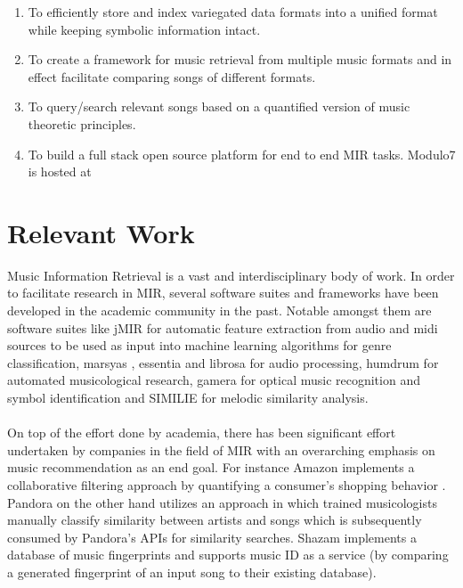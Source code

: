 \documentclass{article}
\begin{document}
\begin{enumerate}
\item To efficiently store and index variegated data formats into a unified format while keeping symbolic information intact.
\item To create a framework for music retrieval from multiple music formats and in effect facilitate comparing songs of different formats.
\item To query/search relevant songs based on a quantified version of music theoretic principles. 
\item To build a full stack open source platform for end to end MIR tasks. Modulo7 is hosted at \cite{m7code}
\end{enumerate}

%
\section{Relevant Work} \label{sec:relevantwork}

Music Information Retrieval is a vast and interdisciplinary body of work. In order to facilitate research in MIR, several software suites and frameworks have been developed in the academic community in the past. Notable amongst them are software suites like jMIR \cite{jMIR} for automatic feature extraction from audio and midi sources to be used as input into machine learning algorithms for genre classification, marsyas \cite{marsyas}, essentia \cite{essentia} and librosa \cite{librosa} for audio processing, humdrum \cite{humdrum} for automated musicological research, gamera \cite{gamera} for optical music recognition and symbol identification and SIMILIE \cite{similie} for melodic similarity analysis. \\\\
On top of the effort done by academia, there has been significant effort undertaken by companies in the field of MIR with an overarching emphasis on music recommendation as an end goal. For instance Amazon implements a collaborative filtering approach by quantifying a consumer's shopping behavior \cite{amazonreco}. Pandora on the other hand utilizes an approach in which trained musicologists manually classify similarity between artists and songs \cite{musicgenomepandora} which is subsequently consumed by Pandora's APIs for similarity searches. Shazam \cite{shazam} implements a database of music fingerprints and supports music ID as a service (by comparing a generated fingerprint of an input song to their existing database). 
 
\end{document}
